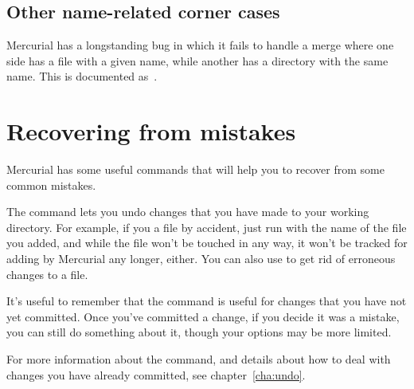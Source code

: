 \subsection{Other name-related corner cases}

Mercurial has a longstanding bug in which it fails to handle a merge
where one side has a file with a given name, while another has a
directory with the same name.  This is documented as~.

\section{Recovering from mistakes}

Mercurial has some useful commands that will help you to recover from
some common mistakes.

The  command lets you undo changes that you have made to
your working directory.  For example, if you  a file by
accident, just run  with the name of the file you added,
and while the file won't be touched in any way, it won't be tracked
for adding by Mercurial any longer, either.  You can also use
 to get rid of erroneous changes to a file.

It's useful to remember that the  command is useful for
changes that you have not yet committed.  Once you've committed a
change, if you decide it was a mistake, you can still do something
about it, though your options may be more limited.

For more information about the  command, and details
about how to deal with changes you have already committed, see
chapter~\ref{cha:undo}.

